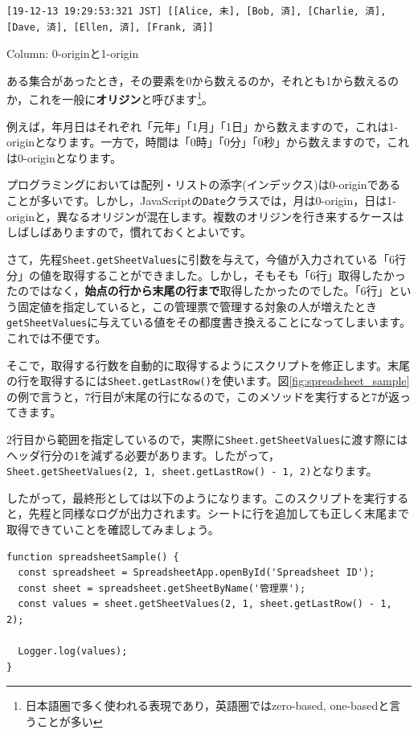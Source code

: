 \documentclass[uplatex,a4j]{jsarticle}
\begin{document}
\begin{lstlisting}[basicstyle=\ttfamily\footnotesize,frame=single,caption=SpreadsheetApp output sample 1]
[19-12-13 19:29:53:321 JST] [[Alice, 未], [Bob, 済], [Charlie, 済], [Dave, 済], [Ellen, 済], [Frank, 済]]
\end{lstlisting}

\begin{itembox}[l]{Column: 0-originと1-origin}

ある集合があったとき，その要素を0から数えるのか，それとも1から数えるのか，これを一般に\textbf{オリジン}と呼びます\footnote{日本語圏で多く使われる表現であり，英語圏ではzero-based, one-basedと言うことが多い}。

例えば，年月日はそれぞれ「元年」「1月」「1日」から数えますので，これは1-originとなります。一方で，時間は「0時」「0分」「0秒」から数えますので，これは0-originとなります。

プログラミングにおいては配列・リストの添字(インデックス)は0-originであることが多いです。しかし，JavaScriptの\verb|Date|クラスでは，月は0-origin，日は1-originと，異なるオリジンが混在します。複数のオリジンを行き来するケースはしばしばありますので，慣れておくとよいです。

\end{itembox}


さて，先程\verb|Sheet.getSheetValues|に引数を与えて，今値が入力されている「6行分」の値を取得することができました。しかし，そもそも「6行」取得したかったのではなく，\textbf{始点の行から末尾の行まで}取得したかったのでした。「6行」という固定値を指定していると，この管理票で管理する対象の人が増えたとき\verb|getSheetValues|に与えている値をその都度書き換えることになってしまいます。これでは不便です。

そこで，取得する行数を自動的に取得するようにスクリプトを修正します。末尾の行を取得するには\verb|Sheet.getLastRow()|を使います。図\ref{fig:spreadsheet_sample}の例で言うと，7行目が末尾の行になるので，このメソッドを実行すると7が返ってきます。

2行目から範囲を指定しているので，実際に\verb|Sheet.getSheetValues|に渡す際にはヘッダ行分の1を減ずる必要があります。したがって，\verb|Sheet.getSheetValues(2, 1, sheet.getLastRow() - 1, 2)|となります。

したがって，最終形としては以下のようになります。このスクリプトを実行すると，先程と同様なログが出力されます。シートに行を追加しても正しく末尾まで取得できていことを確認してみましょう。

\begin{lstlisting}[basicstyle=\ttfamily\footnotesize,frame=single,caption=SpreadsheetApp sample 5]
function spreadsheetSample() {
  const spreadsheet = SpreadsheetApp.openById('Spreadsheet ID');
  const sheet = spreadsheet.getSheetByName('管理票');
  const values = sheet.getSheetValues(2, 1, sheet.getLastRow() - 1, 2);
  
  Logger.log(values);
}
\end{lstlisting}
\end{document}
